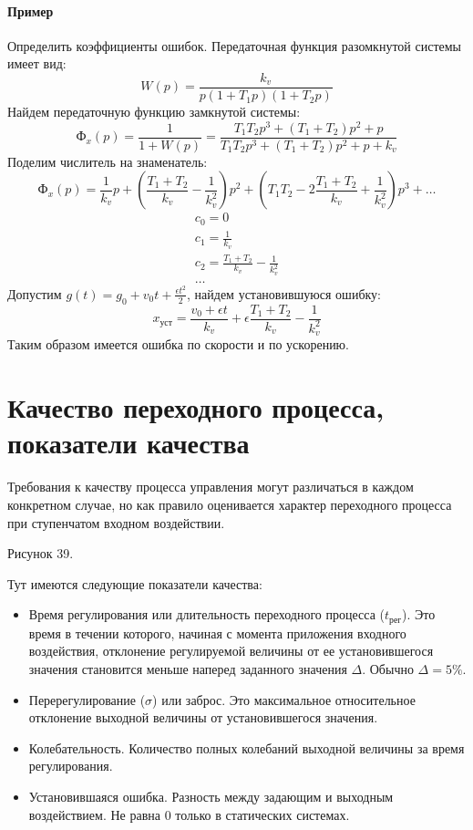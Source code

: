 \paragraph{Пример}
Определить коэффициенты ошибок.
Передаточная функция разомкнутой системы имеет вид:
$$
	W(p)=\frac{k_v}{p(1+T_1p)(1+T_2p)}
$$
Найдем передаточную функцию замкнутой системы:
$$
	\text{Ф}_x(p)=\frac{1}{1+W(p)}=\frac{T_1T_2p^3+(T_1+T_2)p^2+p}{T_1T_2p^3+(T_1+T_2)p^2+p+k_v}
$$
Поделим числитель на знаменатель:
$$
	\text{Ф}_x(p)=\frac1{k_v}p+(\frac{T_1+T_2}{k_v}-\frac1{k_v^2})p^2+(T_1T_2-2\frac{T_1+T_2}{k_v}+\frac1{k_v^2})p^3+\ldots
$$
\begin{align*}
	c_0=0 \\
	c_1=\frac1{k_v} \\
	c_2=\frac{T_1+T_2}{k_v}-\frac1{k_v^2} \\
	\ldots
\end{align*}
Допустим $g(t)=g_0+v_0t+\frac{\epsilon{}t^2}{2}$, найдем установившуюся ошибку:
$$
	x_{\text{уст}}=\frac{v_0+\epsilon{}t}{k_v}+\epsilon\frac{T_1+T_2}{k_v}-\frac1{k_v^2}
$$
Таким образом имеется ошибка по скорости и по ускорению.

\section{Качество переходного процесса, показатели качества}
Требования к качеству процесса управления могут различаться в каждом конкретном случае, но как правило оценивается характер переходного процесса при ступенчатом входном воздействии.

Рисунок 39.

Тут имеются следующие показатели качества:
\begin{itemize}
	\item Время регулирования или длительность переходного процесса ($t_{\text{рег}}$). Это время в течении которого, начиная с момента приложения входного воздействия, отклонение регулируемой величины от ее установившегося значения становится меньше наперед заданного значения $\Delta$. Обычно $\Delta=5\%$.
	\item Перерегулирование ($\sigma$) или заброс. Это максимальное относительное отклонение выходной величины от установившегося значения.
	\item Колебательность. Количество полных колебаний выходной величины за время регулирования.
	\item Установившаяся ошибка. Разность между задающим и выходным воздействием. Не равна 0 только в статических системах.
\end{itemize}


